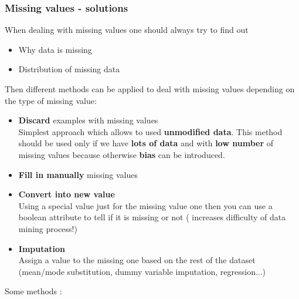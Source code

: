 \subsubsection{Missing values - solutions}
When dealing with missing values one should always try to find out 
\begin{itemize}
\item Why data is missing
\item Distribution of missing data
\end{itemize}
Then different methods can be applied to deal with missing values depending on the type of missing value:
\begin{itemize}
\item \textbf{Discard} examples with missing values\\
Simplest approach which allows to used \textbf{unmodified data}. This method should be used only if we have \textbf{lots of data} and with \textbf{low number} of missing values because otherwise \textbf{bias} can be introduced.
\item \textbf{Fill in manually} missing values
\item \textbf{Convert into new value}\\
Using a special value just for the missing value one then you can use a boolean attribute to tell if it is missing or not ( increases difficulty of data mining process!)
\item \textbf{Imputation}\\
Assign a value to the missing one based on the rest of the dataset (mean/mode substitution, dummy variable imputation, regression...)
\end{itemize}
Some methods : 
